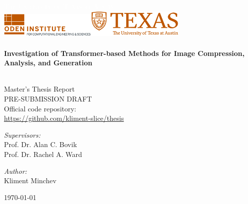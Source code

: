 \begin{titlepage}


\TITLEBOX

\begin{center}



\sffamily\textsc{\huge{\textcolor{white}{The University of Texas at Austin}}}\\[4cm]


\includegraphics[width=0.35\textwidth]{media/faculty.png}\makebox[1.5cm]{}\includegraphics[width=0.35\textwidth]{media/unilogo.png}~\\[1.5cm]



\HRule \\[0.4cm]
{
 \huge \bfseries \sffamily Investigation of Transformer-based Methods for Image Compression, Analysis, and Generation  \\[0.4cm] 
}

\HRule \\[0.4cm] 

\normalfont \LARGE \sffamily Master's Thesis Report \\[1.5cm]
\normalfont \large \sffamily PRE-SUBMISSION DRAFT \\[0.5cm]
\normalfont \large \sffamily Official code repository: \\
\normalfont \large \sffamily \url{https://github.com/kliment-slice/thesis} \\[1.0cm]

\noindent
\begin{minipage}{0.4\textwidth}
\begin{flushleft} \large
\emph{Supervisors:} \\
Prof. Dr. Alan C. Bovik\\
Prof. Dr. Rachel A. Ward\\
\end{flushleft}
\end{minipage}%
\begin{minipage}{0.4\textwidth}
\begin{flushright} \large
\emph{Author:}\\
Kliment Minchev\\
\end{flushright}
\end{minipage}

\vfill


{\large \today}

\vfill



\end{center}
\end{titlepage}

